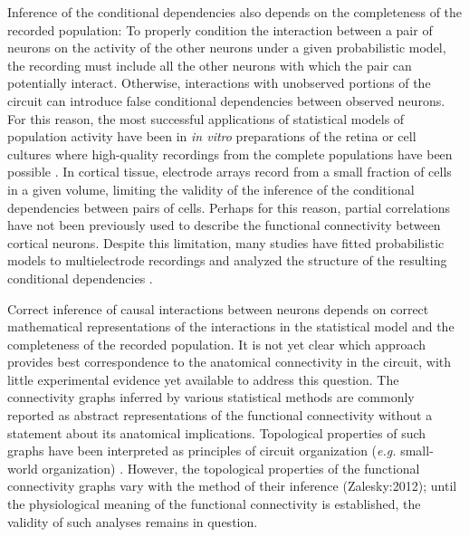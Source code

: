 \documentclass[10pt]{article}
\begin{document}
Inference of the conditional dependencies also depends on the completeness of the recorded population:  To properly condition the interaction between a pair of neurons on the activity of the other neurons under a given probabilistic model, the recording must include all the other neurons with which the pair can potentially interact. Otherwise, interactions with unobserved portions of the circuit can introduce false conditional dependencies between observed neurons. For this reason, the most successful applications of statistical models of population activity have been in \emph{in vitro} preparations of the retina or cell cultures where high-quality recordings from the complete populations have been possible \cite{Pillow:2008}. In cortical tissue, electrode arrays record from a small fraction of cells in a given volume, limiting the validity of the inference of the conditional dependencies between pairs of cells. Perhaps for this reason, partial correlations have not been previously used to describe the functional connectivity between cortical neurons.  Despite this limitation, many studies have fitted probabilistic models to multielectrode recordings and analyzed the structure of the resulting conditional dependencies \cite{Tang:2008, Yu:2008}.  

Correct inference of causal interactions between neurons depends on correct mathematical representations of the interactions in the statistical model and the completeness of the recorded population.  It is not yet clear which approach provides best correspondence to the anatomical connectivity in the circuit, with little experimental evidence yet available to address this question.  The connectivity graphs inferred by various statistical methods are commonly reported as abstract representations of the functional connectivity without a statement about its anatomical implications.  
Topological properties of such graphs have been interpreted as principles of circuit organization (\emph{e.g.} small-world organization) \cite{Feldt:2011, Yu:2008, Malmersjo:2013}.  However, the topological properties of the functional connectivity graphs vary with the method of their inference (Zalesky:2012); until the physiological meaning of the functional connectivity is established, the validity of such analyses remains in question.
\end{document}
